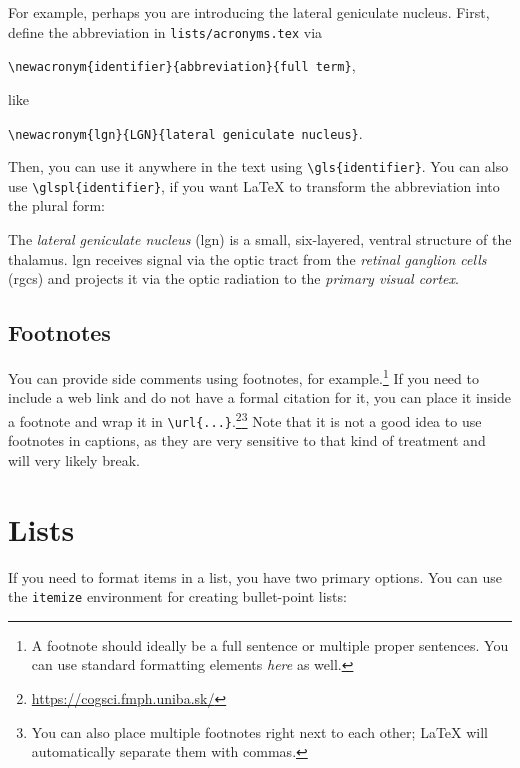 For example, perhaps you are introducing the lateral geniculate nucleus. First, define the abbreviation in
\verb|lists/acronyms.tex| via
\begin{displayquote}
    \verb|\newacronym{identifier}{abbreviation}{full term}|,
\end{displayquote}
like
\begin{displayquote}
    \verb|\newacronym{lgn}{LGN}{lateral geniculate nucleus}|.
\end{displayquote}
Then, you can use it anywhere in the text using \verb|\gls{identifier}|. You can also use \verb|\glspl{identifier}|,
if you want \LaTeX{} to transform the abbreviation into the plural form:
\begin{displayquote}
    The \emph{lateral geniculate nucleus} (\gls{lgn}) is a small, six-layered, ventral structure of the thalamus.
    \gls{lgn} receives signal via the optic tract from the \emph{retinal ganglion cells} (\glspl{rgc}) and projects
    it via the optic radiation to the \emph{primary visual cortex}.
\end{displayquote}

\subsection{Footnotes}

You can provide side comments using footnotes, for example.\footnote{A footnote should ideally be a full
sentence or multiple proper sentences. You can use standard formatting elements \emph{here} as well.}
If you need to include a web link and do not have a formal citation for it, you can place it inside a footnote and
wrap it in \verb|\url{...}|.\footnote{\url{https://cogsci.fmph.uniba.sk/}}\footnote{You can also place multiple
footnotes right next to each other; \LaTeX{} will automatically separate them with commas.} Note that it is not a
good idea to use footnotes in captions, as they are very sensitive to that kind of treatment and will very likely break.


\section{Lists}
\label{sec:lists}

If you need to format items in a list, you have two primary options.
You can use the \verb|itemize| environment for creating bullet-point lists:

